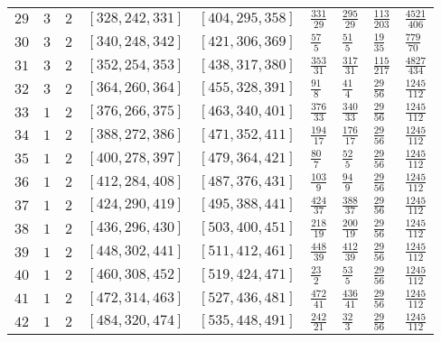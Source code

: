 \documentclass[12pt]{extarticle}
\begin{document}
\begin{longtable}{lllllllll}
$29$ & $3$ & $2$ & $\left[328, 242, 331\right]$ & $\left[404, 295, 358\right]$ & $\frac{331}{29}$ & $\frac{295}{29}$ & $\frac{113}{203}$ & $\frac{4521}{406}$ \\
$30$ & $3$ & $2$ & $\left[340, 248, 342\right]$ & $\left[421, 306, 369\right]$ & $\frac{57}{5}$ & $\frac{51}{5}$ & $\frac{19}{35}$ & $\frac{779}{70}$ \\
$31$ & $3$ & $2$ & $\left[352, 254, 353\right]$ & $\left[438, 317, 380\right]$ & $\frac{353}{31}$ & $\frac{317}{31}$ & $\frac{115}{217}$ & $\frac{4827}{434}$ \\
$32$ & $3$ & $2$ & $\left[364, 260, 364\right]$ & $\left[455, 328, 391\right]$ & $\frac{91}{8}$ & $\frac{41}{4}$ & $\frac{29}{56}$ & $\frac{1245}{112}$ \\
$33$ & $1$ & $2$ & $\left[376, 266, 375\right]$ & $\left[463, 340, 401\right]$ & $\frac{376}{33}$ & $\frac{340}{33}$ & $\frac{29}{56}$ & $\frac{1245}{112}$ \\
$34$ & $1$ & $2$ & $\left[388, 272, 386\right]$ & $\left[471, 352, 411\right]$ & $\frac{194}{17}$ & $\frac{176}{17}$ & $\frac{29}{56}$ & $\frac{1245}{112}$ \\
$35$ & $1$ & $2$ & $\left[400, 278, 397\right]$ & $\left[479, 364, 421\right]$ & $\frac{80}{7}$ & $\frac{52}{5}$ & $\frac{29}{56}$ & $\frac{1245}{112}$ \\
$36$ & $1$ & $2$ & $\left[412, 284, 408\right]$ & $\left[487, 376, 431\right]$ & $\frac{103}{9}$ & $\frac{94}{9}$ & $\frac{29}{56}$ & $\frac{1245}{112}$ \\
$37$ & $1$ & $2$ & $\left[424, 290, 419\right]$ & $\left[495, 388, 441\right]$ & $\frac{424}{37}$ & $\frac{388}{37}$ & $\frac{29}{56}$ & $\frac{1245}{112}$ \\
$38$ & $1$ & $2$ & $\left[436, 296, 430\right]$ & $\left[503, 400, 451\right]$ & $\frac{218}{19}$ & $\frac{200}{19}$ & $\frac{29}{56}$ & $\frac{1245}{112}$ \\
$39$ & $1$ & $2$ & $\left[448, 302, 441\right]$ & $\left[511, 412, 461\right]$ & $\frac{448}{39}$ & $\frac{412}{39}$ & $\frac{29}{56}$ & $\frac{1245}{112}$ \\
$40$ & $1$ & $2$ & $\left[460, 308, 452\right]$ & $\left[519, 424, 471\right]$ & $\frac{23}{2}$ & $\frac{53}{5}$ & $\frac{29}{56}$ & $\frac{1245}{112}$ \\
$41$ & $1$ & $2$ & $\left[472, 314, 463\right]$ & $\left[527, 436, 481\right]$ & $\frac{472}{41}$ & $\frac{436}{41}$ & $\frac{29}{56}$ & $\frac{1245}{112}$ \\
$42$ & $1$ & $2$ & $\left[484, 320, 474\right]$ & $\left[535, 448, 491\right]$ & $\frac{242}{21}$ & $\frac{32}{3}$ & $\frac{29}{56}$ & $\frac{1245}{112}$ \\

\end{longtable}
\end{document}
